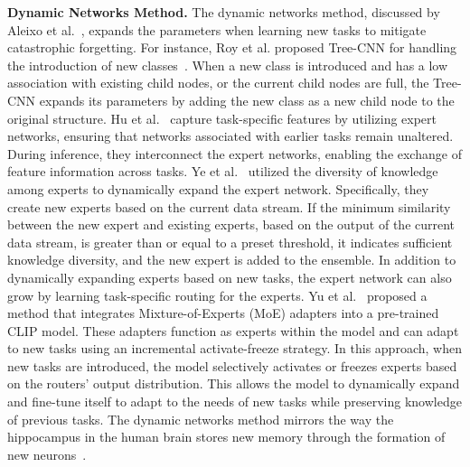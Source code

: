 \documentclass[journal,hideappendix]{vgtc}
\newenvironment{j_itemize}{
\begin{itemize}[]
  \setlength{\itemsep}{3pt}
  \setlength{\parskip}{0pt}
  \setlength{\parsep}{0pt}
}{\end{itemize}}
\begin{document}
\begin{j_itemize}
    \item[$\bullet$] \textbf{Dynamic Networks Method.} The dynamic networks method, discussed by Aleixo et al.~\cite{aleixo2023catastrophic}, expands the parameters when learning new tasks to mitigate catastrophic forgetting. For instance, Roy et al. proposed Tree-CNN for handling the introduction of new classes~\cite{roy2020tree}. When a new class is introduced and has a low association with existing child nodes, or the current child nodes are full, the Tree-CNN expands its parameters by adding the new class as a new child node to the original structure. Hu et al.~\cite{hu2023dense} capture task-specific features by utilizing expert networks, ensuring that networks associated with earlier tasks remain unaltered. During inference, they interconnect the expert networks, enabling the exchange of feature information across tasks. Ye et al.~\cite{ye2023self} utilized the diversity of knowledge among experts to dynamically expand the expert network. Specifically, they create new experts based on the current data stream. If the minimum similarity between the new expert and existing experts, based on the output of the current data stream, is greater than or equal to a preset threshold, it indicates sufficient knowledge diversity, and the new expert is added to the ensemble. In addition to dynamically expanding experts based on new tasks, the expert network can also grow by learning task-specific routing for the experts. Yu et al.~\cite{yu2024boosting} proposed a method that integrates Mixture-of-Experts (MoE) adapters into a pre-trained CLIP model. These adapters function as experts within the model and can adapt to new tasks using an incremental activate-freeze strategy. In this approach, when new tasks are introduced, the model selectively activates or freezes experts based on the routers' output distribution. This allows the model to dynamically expand and fine-tune itself to adapt to the needs of new tasks while preserving knowledge of previous tasks. The dynamic networks method mirrors the way the hippocampus in the human brain stores new memory through the formation of new neurons~\cite{deisseroth2004excitation}.


\end{j_itemize}
\end{document}
